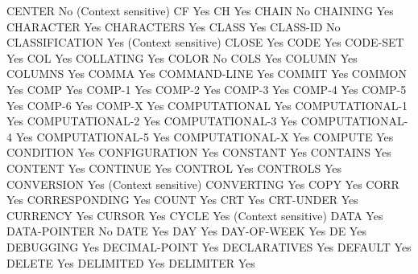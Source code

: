 CENTER                          No (Context sensitive)
CF                              Yes
CH                              Yes
CHAIN                           No
CHAINING                        Yes
CHARACTER                       Yes
CHARACTERS                      Yes
CLASS                           Yes
CLASS-ID                        No
CLASSIFICATION                  Yes (Context sensitive)
CLOSE                           Yes
CODE                            Yes
CODE-SET                        Yes
COL                             Yes
COLLATING                       Yes
COLOR                           No
COLS                            Yes
COLUMN                          Yes
COLUMNS                         Yes
COMMA                           Yes
COMMAND-LINE                    Yes
COMMIT                          Yes
COMMON                          Yes
COMP                            Yes
COMP-1                          Yes
COMP-2                          Yes
COMP-3                          Yes
COMP-4                          Yes
COMP-5                          Yes
COMP-6                          Yes
COMP-X                          Yes
COMPUTATIONAL                   Yes
COMPUTATIONAL-1                 Yes
COMPUTATIONAL-2                 Yes
COMPUTATIONAL-3                 Yes
COMPUTATIONAL-4                 Yes
COMPUTATIONAL-5                 Yes
COMPUTATIONAL-X                 Yes
COMPUTE                         Yes
CONDITION                       Yes
CONFIGURATION                   Yes
CONSTANT                        Yes
CONTAINS                        Yes
CONTENT                         Yes
CONTINUE                        Yes
CONTROL                         Yes
CONTROLS                        Yes
CONVERSION                      Yes (Context sensitive)
CONVERTING                      Yes
COPY                            Yes
CORR                            Yes
CORRESPONDING                   Yes
COUNT                           Yes
CRT                             Yes
CRT-UNDER                       Yes
CURRENCY                        Yes
CURSOR                          Yes
CYCLE                           Yes (Context sensitive)
DATA                            Yes
DATA-POINTER                    No
DATE                            Yes
DAY                             Yes
DAY-OF-WEEK                     Yes
DE                              Yes
DEBUGGING                       Yes
DECIMAL-POINT                   Yes
DECLARATIVES                    Yes
DEFAULT                         Yes
DELETE                          Yes
DELIMITED                       Yes
DELIMITER                       Yes

